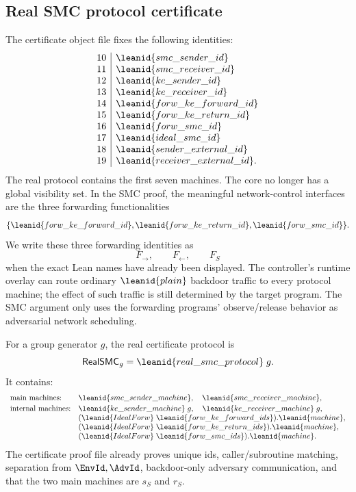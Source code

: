 \subsection{Real SMC protocol certificate}

\begin{definition}
The certificate object file fixes the following identities:
\[
\begin{array}{c|l}
10 & \leanid{smc\_sender\_id}\\
11 & \leanid{smc\_receiver\_id}\\
12 & \leanid{ke\_sender\_id}\\
13 & \leanid{ke\_receiver\_id}\\
14 & \leanid{forw\_ke\_forward\_id}\\
15 & \leanid{forw\_ke\_return\_id}\\
16 & \leanid{forw\_smc\_id}\\
17 & \leanid{ideal\_smc\_id}\\
18 & \leanid{sender\_external\_id}\\
19 & \leanid{receiver\_external\_id}.
\end{array}
\]
The real protocol contains the first seven machines.  The core no longer has
a global visibility set.  In the SMC proof, the meaningful network-control
interfaces are the three forwarding functionalities
\[
  \{
    \leanid{forw\_ke\_forward\_id},
    \leanid{forw\_ke\_return\_id},
    \leanid{forw\_smc\_id}
  \}.
\]
We write these three forwarding identities as
\[
  F_{\to},\qquad F_{\leftarrow},\qquad F_S
\]
when the exact Lean names have already been displayed.
The controller's runtime overlay can route ordinary \(\leanid{plain}\)
backdoor traffic to every protocol machine; the effect of such traffic is still
determined by the target program.  The SMC argument only uses the forwarding
programs' observe/release behavior as adversarial network scheduling.
\end{definition}

\begin{definition}
For a group generator \(g\), the real certificate protocol is
\[
  \RealSMC_g=\leanid{real\_smc\_protocol}\;g .
\]
It contains:
\[
\begin{array}{ll}
\hbox{main machines:}&
  \leanid{smc\_sender\_machine},\quad
  \leanid{smc\_receiver\_machine},\\[0.2em]
\hbox{internal machines:}&
  \leanid{ke\_sender\_machine}\;g,\quad
  \leanid{ke\_receiver\_machine}\;g,\\
&
  (\leanid{IdealForw}\;\leanid{forw\_ke\_forward\_ids}).\leanid{machine},\\
&
  (\leanid{IdealForw}\;\leanid{forw\_ke\_return\_ids}).\leanid{machine},\\
&
  (\leanid{IdealForw}\;\leanid{forw\_smc\_ids}).\leanid{machine}.
\end{array}
\]
The certificate proof file already proves unique ids, caller/subroutine
matching, separation from \(\EnvId,\AdvId\), backdoor-only adversary
communication, and that the two main machines are \(s_S\) and \(r_S\).
\end{definition}

